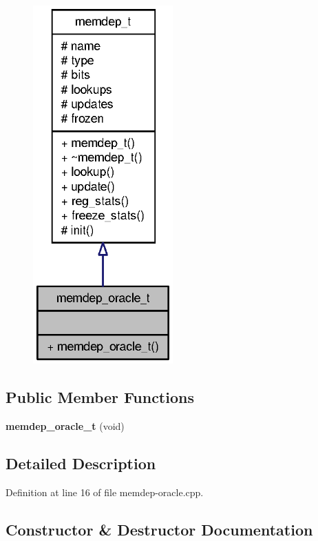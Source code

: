\begin{figure}[H]
\begin{center}
\leavevmode
\includegraphics[width=152pt]{classmemdep__oracle__t__coll__graph}
\end{center}
\end{figure}
\subsection*{Public Member Functions}
\begin{CompactItemize}
\item 
{\bf memdep\_\-oracle\_\-t} (void)
\end{CompactItemize}


\subsection{Detailed Description}


Definition at line 16 of file memdep-oracle.cpp.

\subsection{Constructor \& Destructor Documentation}
